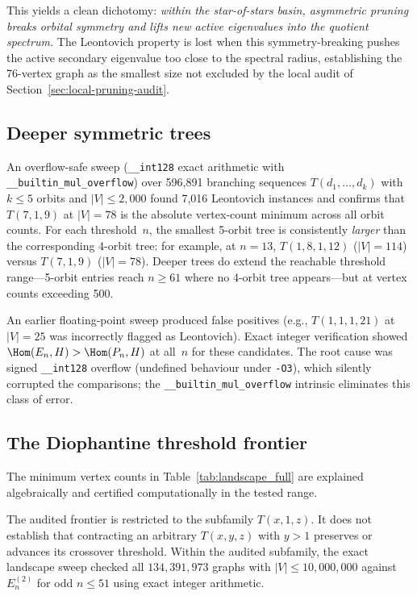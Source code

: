 This yields a clean dichotomy: \emph{within the star-of-stars basin,
asymmetric pruning breaks orbital symmetry and lifts new active eigenvalues
into the quotient spectrum.} The Leontovich property is lost when this
symmetry-breaking pushes the active secondary eigenvalue too close to the
spectral radius, establishing the 76-vertex graph as the smallest size not
excluded by the local audit of Section~\ref{sec:local-pruning-audit}.

\subsection*{Deeper symmetric trees}

An overflow-safe sweep (\texttt{\_\_int128} exact arithmetic with
\texttt{\_\_builtin\_mul\_overflow}) over 596,891 branching sequences
$T(d_1, \ldots, d_k)$ with $k \le 5$ orbits and $|V| \le 2{,}000$
found 7,016 Leontovich instances and confirms that $T(7,1,9)$ at
$|V| = 78$ is the absolute vertex-count minimum across all orbit
counts.  For each threshold~$n$, the smallest 5-orbit tree is
consistently \emph{larger} than the corresponding 4-orbit tree:
for example, at $n = 13$, $T(1,8,1,12)$ ($|V| = 114$) versus
$T(7,1,9)$ ($|V| = 78$).  Deeper trees do extend the reachable
threshold range---5-orbit entries reach $n \ge 61$ where no 4-orbit
tree appears---but at vertex counts exceeding 500.

An earlier floating-point sweep produced false positives (e.g.,
$T(1,1,1,21)$ at $|V| = 25$ was incorrectly flagged as Leontovich).
Exact integer verification showed $\Hom(E_n, H) > \Hom(P_n, H)$ at
all~$n$ for these candidates.  The root cause was signed
\texttt{\_\_int128} overflow (undefined behaviour under \texttt{-O3}),
which silently corrupted the comparisons; the
\texttt{\_\_builtin\_mul\_overflow} intrinsic eliminates this class
of error.

\subsection*{The Diophantine threshold frontier}

The minimum vertex counts in Table~\ref{tab:landscape_full} are
explained algebraically and certified computationally in the tested range.

The audited frontier is restricted to the subfamily $T(x,1,z)$. It does
not establish that contracting an arbitrary $T(x,y,z)$ with $y>1$
preserves or advances its crossover threshold. Within the audited
subfamily, the exact landscape sweep checked all $134{,}391{,}973$
graphs with $|V| \le 10{,}000{,}000$ against $E_n^{(2)}$ for odd
$n \le 51$ using exact integer arithmetic.

